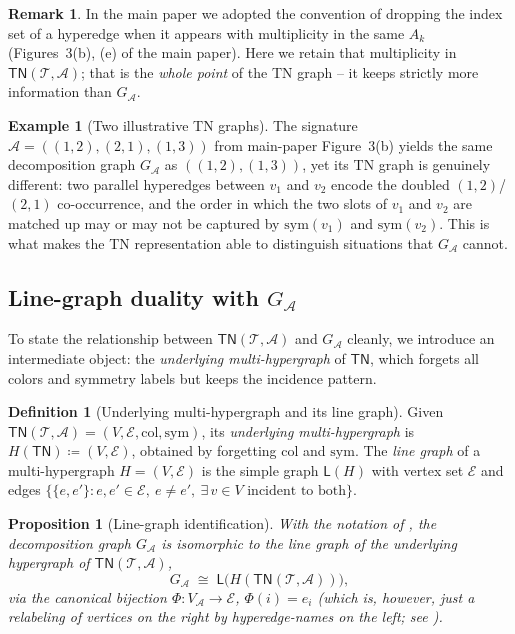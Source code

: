 \documentclass[11pt]{article}
\newcommand{\calA}{\mathcal{A}}
\newcommand{\calT}{\mathcal{T}}
\newcommand{\calE}{\mathcal{E}}
\newcommand{\TN}{\mathsf{TN}}
\newcommand{\LG}{\mathsf{L}}                       %
\theoremstyle{plain}
\newtheorem{proposition}[theorem]{Proposition}
\theoremstyle{definition}
\newtheorem{definition}[theorem]{Definition}
\newtheorem{example}[theorem]{Example}
\newtheorem{remark}[theorem]{Remark}
\begin{document}
\begin{remark}
In the main paper we adopted the convention of dropping the index set of a
hyperedge when it appears with multiplicity in the same $A_k$ (Figures~3(b),
(e) of the main paper).  Here we retain that multiplicity in
$\TN(\calT,\calA)$; that is the \emph{whole point} of the TN graph -- it
keeps strictly more information than $G_\calA$.
\end{remark}

\begin{example}[Two illustrative TN graphs]
\label{ex:tn-vs-g}
The signature $\calA=((1,2),(2,1),(1,3))$ from main-paper Figure~3(b)
yields the same decomposition graph $G_\calA$ as $((1,2),(1,3))$, yet its
TN graph is genuinely different: two parallel hyperedges between $v_1$ and
$v_2$ encode the doubled $(1,2)$/$(2,1)$ co-occurrence, and the order in
which the two slots of $v_1$ and $v_2$ are matched up may or may not be
captured by $\mathrm{sym}(v_1)$ and $\mathrm{sym}(v_2)$.  This is what makes
the TN representation able to distinguish situations that $G_\calA$ cannot.
\end{example}

\subsection{Line-graph duality with $G_\calA$}

To state the relationship between $\TN(\calT,\calA)$ and $G_\calA$ cleanly,
we introduce an intermediate object: the \emph{underlying multi-hypergraph}
of $\TN$, which forgets all colors and symmetry labels but keeps the
incidence pattern.

\begin{definition}[Underlying multi-hypergraph and its line graph]
\label{def:underlying-hypergraph}
Given $\TN(\calT,\calA)=(V,\calE,\mathrm{col},\mathrm{sym})$, its
\emph{underlying multi-hypergraph} is
$H(\TN)\coloneqq (V,\calE)$, obtained by forgetting $\mathrm{col}$ and
$\mathrm{sym}$.  The \emph{line graph} of a multi-hypergraph $H=(V,\calE)$
is the simple graph $\LG(H)$ with vertex set $\calE$ and edges
$\{\{e,e'\}:e,e'\in\calE,\ e\neq e',\ \exists\,v\in V \text{ incident to both}\}$.
\end{definition}

\begin{proposition}[Line-graph identification]
\label{prop:line-graph-duality}
With the notation of , the decomposition
graph $G_\calA$ is isomorphic to the line graph of the underlying
hypergraph of $\TN(\calT,\calA)$,
\[
   G_\calA \;\cong\; \LG\bigl(H(\TN(\calT,\calA))\bigr),
\]
via the canonical bijection $\Phi:V_\calA\to\calE$, $\Phi(i)=e_i$
\textup{(which is, however, just a relabeling of vertices on the right by
hyperedge-names on the left; see ).}
\end{proposition}
\end{document}
